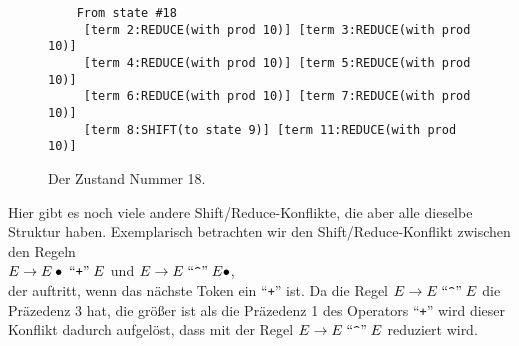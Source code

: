 \begin{enumerate}
\begin{figure}[!ht]
\begin{Verbatim}
    From state #18
     [term 2:REDUCE(with prod 10)] [term 3:REDUCE(with prod 10)]
     [term 4:REDUCE(with prod 10)] [term 5:REDUCE(with prod 10)]
     [term 6:REDUCE(with prod 10)] [term 7:REDUCE(with prod 10)]
     [term 8:SHIFT(to state 9)] [term 11:REDUCE(with prod 10)]
    \end{Verbatim} 
    \vspace*{-0.3cm}
    \caption{Der Zustand Nummer 18.}
    \label{fig:state18}
  \end{figure}

      Hier gibt es noch viele andere Shift/Reduce-Konflikte, die aber alle dieselbe Struktur haben.
      Exemplarisch betrachten wir den Shift/Reduce-Konflikt zwischen den Regeln
      \\[0.2cm]
      \hspace*{1.3cm}
      $E \rightarrow E \bullet \;\mbox{``\texttt{+}''}\; E$ \quad und \quad
      $E \rightarrow E \quoted{\symbol{94}} E  \bullet$,
      \\[0.2cm]
      der auftritt, wenn das n\"achste Token ein ``\texttt{+}'' ist.  Da die Regel 
      $E \rightarrow E \quoted{\symbol{94}} E$ die Pr\"azedenz 3 hat, die gr\"o{\ss}er ist als die Pr\"azedenz 1 des
      Operators ``\texttt{+}'' wird dieser Konflikt dadurch aufgel\"ost, dass mit der Regel 
      $E \rightarrow E \quoted{\symbol{94}} E$ reduziert wird. 
\end{enumerate}    
\vspace*{\fill} \pagebreak

